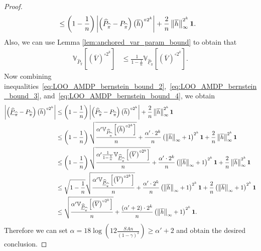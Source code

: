 \documentclass{article}
\theoremstyle{plain}
\theoremstyle{plain}
\theoremstyle{remark}
\theoremstyle{plain}
\theoremstyle{plain}
\newcommand{\Var}{\mathbb{V}}
\newcommand{\Phat}{\widehat{P}}
\newcommand{\one}{\mathbf{1}}
\newcommand{\pihat}{\widehat{\pi}}
\newcommand{\Vc}{\overline{V}}
\newcommand{\hc}{\overline{h}}
\newcommand{\Phatanc}{\underline{\Phat}}
\begin{document}
\begin{proof}
\begin{align}
         & \leq \left( 1 - \frac{1}{n}\right)\left| \left(\Phat_{\pihat} - P_{\pihat}\right) \left( \hc \right)^{\circ 2^k} \right| + \frac{2}{n}  \infnorm{\hc}^{2^k} \one. \label{eq:LOO_AMDP_bernstein_bound_3}
    \end{align}
    Also, we can use Lemma \ref{lem:anchored_var_param_bound} to obtain that
    \begin{align}
        \Var_{\Phat_{\pihat}} \left[ \left(\Vc \right)^{\circ 2^k}  \right] & \leq \frac{1}{1- \frac{1}{n}} \Var_{\Phatanc_{\pihat}} \left[ \left(\Vc \right)^{\circ 2^k}  \right].\label{eq:LOO_AMDP_bernstein_bound_4}
    \end{align}
    Now combining inequalities~\eqref{eq:LOO_AMDP_bernstein_bound_2},~\eqref{eq:LOO_AMDP_bernstein_bound_3}, and~\eqref{eq:LOO_AMDP_bernstein_bound_4}, we obtain
    \begin{align*}
        \left| \left(\Phatanc_{\pihat} - P_{\pihat}\right) \left( \hc \right)^{\circ 2^k} \right| 
        & \leq \left( 1 - \frac{1}{n}\right)\left| \left(\Phat_{\pihat} - P_{\pihat}\right) \left( \hc \right)^{\circ 2^k} \right| + \frac{2}{n}  \infnorm{\hc}^{2^k} \one \\
        & \leq \left( 1 - \frac{1}{n}\right)\sqrt{\frac{\alpha'   \Var_{\Phat_{\pihat}} \left[ \left(\hc \right)^{\circ 2^k}  \right]    }{n }} + \frac{ \alpha' \cdot 2^k }{n}  \left( \infnorm{\hc} + 1\right)^{2^k}   \one + \frac{2}{n}  \infnorm{\hc}^{2^k} \one \\
        & \leq \left( 1 - \frac{1}{n}\right) \sqrt{\frac{\alpha'   \frac{1}{1- \frac{1}{n}} \Var_{\Phatanc_{\pihat}} \left[ \left(\Vc \right)^{\circ 2^k}  \right]  }{n }} + \frac{ \alpha' \cdot 2^k }{n}  \left( \infnorm{\hc} + 1\right)^{2^k}   \one + \frac{2}{n}  \infnorm{\hc}^{2^k} \one \\
        & \leq \sqrt{1 - \frac{1}{n}} \sqrt{\frac{\alpha'    \Var_{\Phatanc_{\pihat}} \left[ \left(\Vc \right)^{\circ 2^k}  \right]  }{n }} + \frac{ \alpha' \cdot 2^k }{n}  \left( \infnorm{\hc} + 1\right)^{2^k}   \one + \frac{2}{n}  \left( \infnorm{\hc} + 1\right)^{2^k} \one \\
        & \leq  \sqrt{\frac{\alpha'    \Var_{\Phatanc_{\pihat}} \left[ \left(\Vc \right)^{\circ 2^k}  \right]  }{n }} + \frac{ (\alpha' + 2) \cdot 2^k }{n}  \left( \infnorm{\hc} + 1\right)^{2^k}   \one.
    \end{align*}
    Therefore we can set $\alpha = 18 \log \left(12 \frac{SAn}{(1-\gamma)^2} \right) \geq \alpha' + 2$ and obtain the desired conclusion.
\end{proof}
\end{document}
